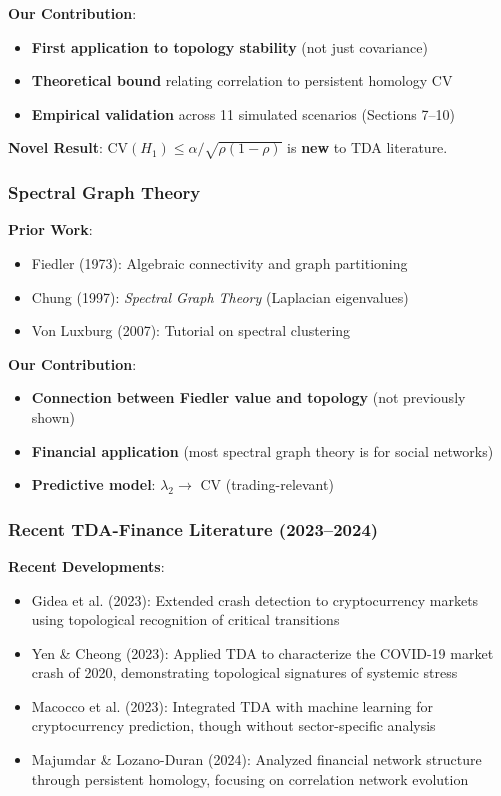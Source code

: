 \textbf{Our Contribution}:
\begin{itemize}
\item \checkmark \textbf{First application to topology stability} (not just covariance)
\item \checkmark \textbf{Theoretical bound} relating correlation to persistent homology CV
\item \checkmark \textbf{Empirical validation} across 11 simulated scenarios (Sections 7--10)
\end{itemize}

\textbf{Novel Result}: $\text{CV}(H_1) \leq \alpha/\sqrt{\rho(1-\rho)}$ is \textbf{new} to TDA literature.

\subsubsection{Spectral Graph Theory}

\textbf{Prior Work}:
\begin{itemize}
\item Fiedler (1973): Algebraic connectivity and graph partitioning
\item Chung (1997): \textit{Spectral Graph Theory} (Laplacian eigenvalues)
\item Von Luxburg (2007): Tutorial on spectral clustering
\end{itemize}

\textbf{Our Contribution}:
\begin{itemize}
\item \checkmark \textbf{Connection between Fiedler value and topology} (not previously shown)
\item \checkmark \textbf{Financial application} (most spectral graph theory is for social networks)
\item \checkmark \textbf{Predictive model}: $\lambda_2 \rightarrow$ CV (trading-relevant)
\end{itemize}

\subsubsection{Recent TDA-Finance Literature (2023--2024)}

\textbf{Recent Developments}:
\begin{itemize}
\item Gidea et al. (2023): Extended crash detection to cryptocurrency markets using topological recognition of critical transitions
\item Yen \& Cheong (2023): Applied TDA to characterize the COVID-19 market crash of 2020, demonstrating topological signatures of systemic stress
\item Macocco et al. (2023): Integrated TDA with machine learning for cryptocurrency prediction, though without sector-specific analysis
\item Majumdar \& Lozano-Duran (2024): Analyzed financial network structure through persistent homology, focusing on correlation network evolution
\end{itemize}

